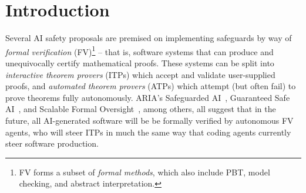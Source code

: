 \section{Introduction}

Several AI safety proposals are premised on implementing safeguards by way of 
\emph{formal verification} 
(FV)\footnote{FV forms a subset of \emph{formal methods}, which also include PBT, model checking, and abstract interpretation.} 
-- 
that is, software systems that can produce and 
unequivocally certify mathematical proofs.
These systems can be split into \emph{interactive theorem provers} (ITPs) which 
accept and validate user-supplied proofs, and \emph{automated theorem provers} (ATPs)
which attempt (but often fail) to prove theorems fully autonomously.
ARIA's Safeguarded AI~\cite{safeguardedAI}, Guaranteed Safe AI~\cite{dalrymple2024guaranteed}, and Scalable Formal Oversight~\cite{sfo,sfo2}, among others, all 
suggest that in the future, all AI-generated 
software will be be formally verified by autonomous FV agents,
who will steer ITPs in much the same way that coding agents currently steer
software production.


